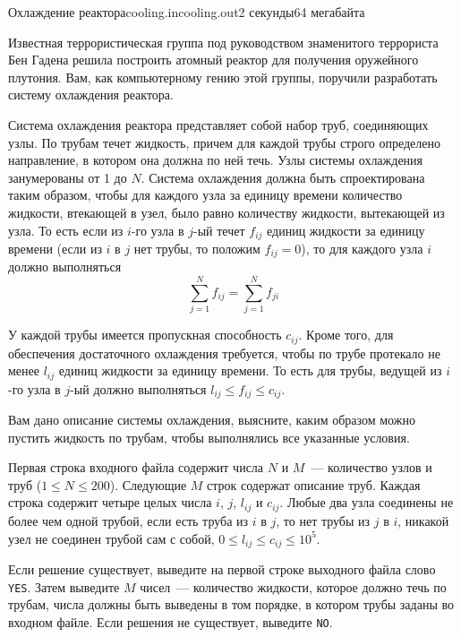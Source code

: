 \begin{problem}{Охлаждение реактора}{cooling.in}{cooling.out}{2 секунды}{64 мегабайта}

Известная террористическая группа под руководством знаменитого террориста Бен 
Гадена решила построить атомный реактор для получения оружейного плутония. Вам,
как компьютерному гению этой группы, поручили разработать систему охлаждения 
реактора. 

Система охлаждения реактора представляет собой набор труб, соединяющих узлы. По 
трубам течет жидкость, причем для каждой трубы строго определено направление, в 
котором она должна по ней течь. Узлы системы охлаждения занумерованы от 1 до 
$N$. Система охлаждения должна быть спроектирована таким образом, чтобы для 
каждого узла за единицу времени количество жидкости, втекающей в узел, было 
равно количеству жидкости, вытекающей из узла. То есть если из $i$-го узла в 
$j$-ый течет $f_{ij}$ единиц жидкости за единицу времени (если из $i$ в $j$ нет 
трубы, то положим $f_{ij} = 0$), то для каждого узла $i$ должно выполняться
$$\sum_{j=1}^{N}f_{ij} = \sum_{j=1}^{N}f_{ji}$$

У каждой трубы имеется пропускная способность $c_{ij}$. Кроме того, для 
обеспечения достаточного охлаждения требуется, чтобы по трубе протекало не 
менее $l_{ij}$ единиц жидкости за единицу времени. То есть для трубы, ведущей 
из $i$-го узла в $j$-ый должно выполняться $l_{ij} \le f_{ij} \le c_{ij}$.

Вам дано описание системы охлаждения, выясните, каким образом можно пустить 
жидкость по трубам, чтобы выполнялись все указанные условия.


\InputFile

Первая строка входного файла содержит числа $N$ и $M$~--- количество узлов и 
труб ($1 \le N \le 200$). Следующие $M$ строк содержат описание труб. Каждая 
строка содержит четыре целых числа $i$, $j$, $l_{ij}$ и $c_{ij}$. Любые два 
узла соединены не более чем одной трубой, если есть труба из $i$ в $j$, то нет 
трубы из $j$ в $i$, никакой узел не соединен трубой сам с собой, 
$0 \le l_{ij} \le c_{ij} \le 10^5$.

\OutputFile

Если решение существует, выведите на первой строке выходного файла слово 
\texttt{YES}. Затем выведите $M$ чисел~--- количество жидкости, которое должно 
течь по трубам, числа должны быть выведены в том порядке, в котором трубы 
заданы во входном файле. Если решения не существует, выведите \texttt{NO}.

\Example

\begin{example}
%
%
\end{example}

\end{problem}
